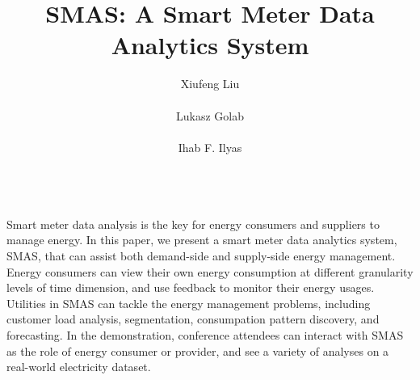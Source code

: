 \documentclass{sig-alternate}
\begin{document}

\title{SMAS: A Smart Meter Data Analytics System}

\author{
\alignauthor
Xiufeng Liu \\
\\
\alignauthor 
Lukasz Golab \\
\\
\alignauthor 
Ihab F. Ilyas \\
\\
}
\maketitle
\begin{abstract}

\end{abstract}
Smart meter data analysis is the key for energy consumers and suppliers to manage energy. In this paper, we present a smart meter data analytics system, SMAS, that can assist both  demand-side and supply-side energy management. Energy consumers can view their own energy consumption at different granularity levels of time dimension, and use feedback to monitor their energy usages. Utilities in SMAS can tackle the energy management problems, including customer load analysis, segmentation, consumpation pattern discovery, and forecasting. In the demonstration, conference attendees can interact with SMAS as the role of energy consumer or provider, and see a variety of analyses on a real-world electricity dataset.


\end{document}
